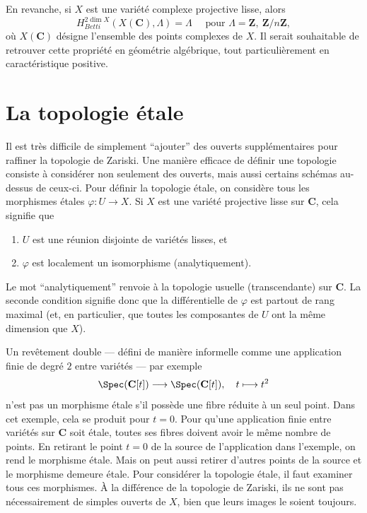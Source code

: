 \medskip\noindent
En revanche, si $X$ est une vari\'et\'e complexe projective lisse, alors
$$
H_{Betti}^{2 \dim X}(X (\mathbf{C}), \Lambda) = \Lambda \quad \text{ pour }
\Lambda = \mathbf{Z}, \ \mathbf{Z}/n\mathbf{Z},
$$
o\`u $X(\mathbf{C})$ d\'esigne l'ensemble des points complexes de $X$. Il serait
souhaitable de retrouver cette propri\'et\'e en g\'eom\'etrie alg\'ebrique, tout
particuli\`erement en caract\'eristique positive.




\section{La topologie \'etale}
\label{section-etale-topology}

\noindent
Il est tr\`es difficile de simplement ``ajouter'' des ouverts suppl\'ementaires
pour raffiner la topologie de Zariski. Une mani\`ere efficace de d\'efinir une
topologie consiste \`a consid\'erer non seulement des ouverts, mais aussi certains
sch\'emas au-dessus de ceux-ci. Pour d\'efinir la topologie \'etale, on consid\`ere
tous les morphismes \'etales $\varphi : U \to X$. Si $X$ est une vari\'et\'e
projective lisse sur $\mathbf{C}$, cela signifie que
\begin{enumerate}
\item $U$ est une r\'eunion disjointe de vari\'et\'es lisses, et
\item $\varphi$ est localement un isomorphisme (analytiquement).
\end{enumerate}
Le mot ``analytiquement'' renvoie \`a la topologie usuelle (transcendante) sur
$\mathbf{C}$. La seconde condition signifie donc que la diff\'erentielle de
$\varphi$ est partout de rang maximal (et, en particulier, que toutes les
composantes de $U$ ont la m\^eme dimension que $X$).

\medskip\noindent
Un rev\^etement double --- d\'efini de mani\`ere informelle comme une application
finie de degr\'e $2$ entre vari\'et\'es --- par exemple
$$
\Spec(\mathbf{C}[t])
\longrightarrow
\Spec(\mathbf{C}[t]),
\quad t \longmapsto t^2
$$
n'est pas un morphisme \'etale s'il poss\`ede une fibre r\'eduite \`a un seul point.
Dans cet exemple, cela se produit pour $t = 0$. Pour qu'une application finie
entre vari\'et\'es sur $\mathbf{C}$ soit \'etale, toutes ses fibres doivent avoir le
m\^eme nombre de points. En retirant le point $t = 0$ de la source de
l'application dans l'exemple, on rend le morphisme \'etale. Mais on peut aussi
retirer d'autres points de la source et le morphisme demeure \'etale. Pour
consid\'erer la topologie \'etale, il faut examiner tous ces morphismes. \`A la
diff\'erence de la topologie de Zariski, ils ne sont pas n\'ecessairement de
simples ouverts de $X$, bien que leurs images le soient toujours.

